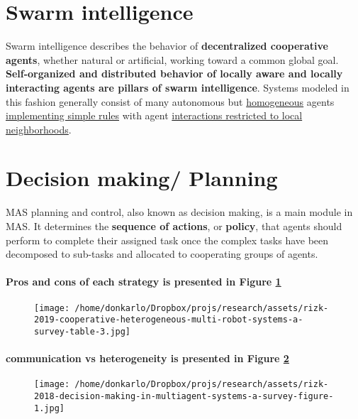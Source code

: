 \documentclass{article}
\begin{document}
	\section{Swarm intelligence} 
	Swarm intelligence describes the behavior of \textbf{decentralized cooperative agents}, whether natural or artificial, working toward a common global goal. \textbf{Self-organized and distributed behavior of locally aware and locally interacting	agents are pillars of swarm intelligence}. Systems modeled in this fashion generally consist of many autonomous but \underline{homogeneous} agents \underline{implementing simple rules} with agent \underline{interactions restricted to local neighborhoods}.
	
	\section{Decision making/ Planning} 
		MAS planning and control, also known as decision making, is a main module in MAS. It determines the \textbf{sequence of actions}, or \textbf{policy}, that agents should perform to complete their assigned task once the complex tasks have been decomposed to sub-tasks and allocated to cooperating groups of agents. \cite{rizk-2019-cooperative-heterogeneous-multi-robot-systems-a-survey}
	
		\paragraph{Pros and cons of each strategy is presented in Figure \ref{fig:decision-making-pros-and-cons}}
		\begin{figure}[h!]
			\centering
			\texttt{[image: /home/donkarlo/Dropbox/projs/research/assets/rizk-2019-cooperative-heterogeneous-multi-robot-systems-a-survey-table-3.jpg]}
			\caption{}
			\label{fig:decision-making-pros-and-cons}
		\end{figure}
		\paragraph{communication vs heterogeneity is presented in Figure \ref{fig:communication-vs-heterogeneity}}
		\begin{figure}[h!]
			\centering
			\texttt{[image: /home/donkarlo/Dropbox/projs/research/assets/rizk-2018-decision-making-in-multiagent-systems-a-survey-figure-1.jpg]}
			\caption{}
			\label{fig:communication-vs-heterogeneity}
		\end{figure}
	
\end{document}
